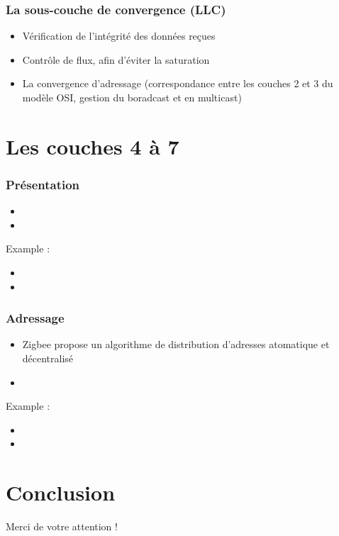 \documentclass{beamer}
\begin{document}
  \begin{frame}
    \frametitle{La sous-couche de convergence (LLC)}
    \begin{itemize}
      \item Vérification de l'intégrité des données reçues
      \item Contrôle de flux, afin d'éviter la saturation
      \item La convergence d'adressage (correspondance entre les couches 2 et 3 du modèle OSI, gestion du boradcast et en multicast)
    \end{itemize}
  \end{frame}

  \section{Les couches 4 à 7}
  \begin{frame}
    \frametitle{Présentation}
    \begin{itemize}
      \item 
      \item 
    \end{itemize}
    Example : 
    \begin{itemize}
      \item 
      \item 
    \end{itemize}
  \end{frame}

  \begin{frame}
    \frametitle{Adressage}
    \begin{itemize}
      \item Zigbee propose un algorithme de distribution d'adresses atomatique et décentralisé
      \item 
    \end{itemize}
    Example : 
    \begin{itemize}
      \item 
      \item 
    \end{itemize}
  \end{frame}

  \section{Conclusion}
  \begin{frame}
    \begin{center}
      Merci de votre attention !
    \end{center}
  \end{frame}
\end{document}
